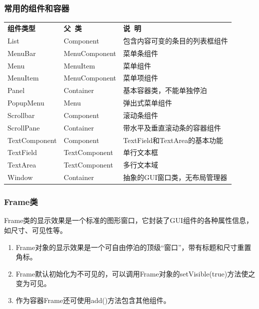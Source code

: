 \begin{frame}[fragile] %
  \frametitle{常用的组件和容器 }

  \begin{table}
    \scriptsize
    \setlength{\extrarowheight}{1.2mm}
    \begin{tabular}{lll}
      {\bf 组件类型} & {\bf 父~类}  & {\bf 说~明}\\
      List & Component & 包含内容可变的条目的列表框组件\\
      MenuBar & MenuComponent & 菜单条组件\\
      Menu & MenuItem & 菜单组件\\
      MenuItem & MenuComponent & 菜单项组件\\
      Panel & Container & 基本容器类，不能单独停泊\\
      PopupMenu & Menu & 弹出式菜单组件\\
      Scrollbar & Component & 滚动条组件\\
      ScrollPane & Container & 带水平及垂直滚动条的容器组件\\
      TextComponent & Component & TextField和TextArea的基本功能\\
      TextField & TextComponent & 单行文本框\\
      TextArea & TextComponent & 多行文本域\\
      Window & Container & 抽象的GUI窗口类，无布局管理器\\
    \end{tabular}
  \end{table}
\end{frame}

\begin{frame}[fragile] %
  \frametitle{Frame类}

  Frame类的显示效果是一个标准的图形窗口，它封装了GUI组件的各种属性信息，如尺寸、可见性等。

  \pause
  
  \begin{enumerate}\kai
  \item Frame对象的显示效果是一个可自由停泊的顶级“窗口”，带有标题和尺寸重置角标。
  \item Frame默认初始化为不可见的，可以调用Frame对象的setVisible(true)方法使之变为可见。
  \item 作为容器Frame还可使用add()方法包含其他组件。
  \end{enumerate}

\end{frame}


